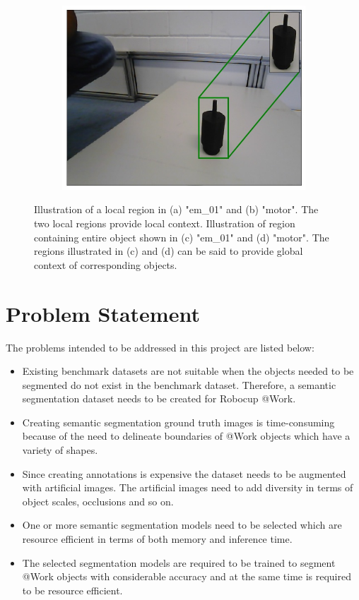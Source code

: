 \begin{figure}[h]
\begin{subfigure}{.4\textwidth}
			\caption{}
			\label{Fig:em01g}
		\end{subfigure}
		\begin{subfigure}{.4\textwidth}
			\centering
			\includegraphics[width=.9\linewidth]{images/motor_context_g}
			\caption{}
			\label{Fig:motorg}
		\end{subfigure}
		\caption{Illustration of a local region in (a) "em\_01" and (b) "motor". The two local regions provide local context. Illustration of region containing entire object shown in (c) "em\_01" and (d) "motor". The regions illustrated in (c) and (d) can be said to provide global context of corresponding objects.}
		\label{Fig:context}
	\end{figure}

\section{Problem Statement}

The problems intended to be addressed in this project are listed below:

	\begin{itemize}
		\item Existing benchmark datasets are not suitable when the objects needed to be segmented do not exist in the benchmark dataset. Therefore, a semantic segmentation dataset needs to be created for Robocup @Work.
		\item Creating semantic segmentation ground truth images is time-consuming because of the need to delineate boundaries of @Work objects which have a variety of shapes.
		\item Since creating annotations is expensive the dataset needs to be augmented with artificial images. The artificial images need to add diversity in terms of object scales, occlusions and so on.
		\item One or more semantic segmentation models need to be selected which are resource efficient in terms of both memory and inference time. 
		\item The selected segmentation models are required to be trained to segment @Work objects with considerable accuracy and at the same time is required to be resource efficient.
	\end{itemize}
